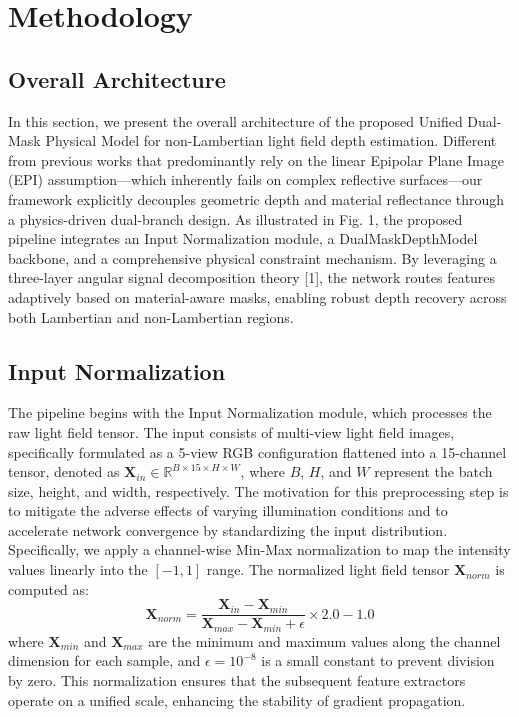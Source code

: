 \section{Methodology}

\subsection{Overall Architecture}

In this section, we present the overall architecture of the proposed Unified Dual-Mask Physical Model for non-Lambertian light field depth estimation. Different from previous works that predominantly rely on the linear Epipolar Plane Image (EPI) assumption—which inherently fails on complex reflective surfaces—our framework explicitly decouples geometric depth and material reflectance through a physics-driven dual-branch design. As illustrated in Fig. 1, the proposed pipeline integrates an Input Normalization module, a DualMaskDepthModel backbone, and a comprehensive physical constraint mechanism. By leveraging a three-layer angular signal decomposition theory [1], the network routes features adaptively based on material-aware masks, enabling robust depth recovery across both Lambertian and non-Lambertian regions.

\subsection{Input Normalization}

The pipeline begins with the Input Normalization module, which processes the raw light field tensor. The input consists of multi-view light field images, specifically formulated as a 5-view RGB configuration flattened into a 15-channel tensor, denoted as $\mathbf{X}_{in} \in \mathbb{R}^{B \times 15 \times H \times W}$, where $B$, $H$, and $W$ represent the batch size, height, and width, respectively. The motivation for this preprocessing step is to mitigate the adverse effects of varying illumination conditions and to accelerate network convergence by standardizing the input distribution. Specifically, we apply a channel-wise Min-Max normalization to map the intensity values linearly into the $[-1, 1]$ range. The normalized light field tensor $\mathbf{X}_{norm}$ is computed as:
\begin{equation}
\label{eq:eq1}
\mathbf{X}_{norm} = \frac{\mathbf{X}_{in} - \mathbf{X}_{min}}{\mathbf{X}_{max} - \mathbf{X}_{min} + \epsilon} \times 2.0 - 1.0
\end{equation}
where $\mathbf{X}_{min}$ and $\mathbf{X}_{max}$ are the minimum and maximum values along the channel dimension for each sample, and $\epsilon = 10^{-8}$ is a small constant to prevent division by zero. This normalization ensures that the subsequent feature extractors operate on a unified scale, enhancing the stability of gradient propagation.

